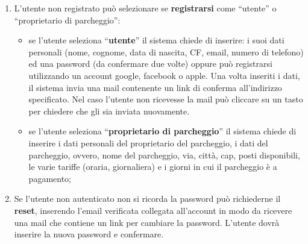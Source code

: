 \begin{enumerate}[start=1,label={\bfseries RF\arabic*}]
    \item \label{itm:RF1} L’utente non registrato può selezionare se \textbf{registrarsi} come “utente” o “proprietario di parcheggio”:
    \begin{itemize}
        \item se l’utente seleziona “\textbf{utente}” il sistema chiede di inserire: i suoi dati personali (nome, cognome, data di nascita, CF, email, numero di telefono) ed una password (da confermare due volte) oppure può registrarsi utilizzando un account google, facebook o apple.
        Una volta inseriti i dati, il sistema invia una mail contenente un link di conferma all’indirizzo specificato. Nel caso l’utente non ricevesse la mail può cliccare su un tasto per chiedere che gli sia inviata nuovamente.
        \item se l’utente seleziona “\textbf{proprietario di parcheggio}” il sistema chiede di inserire i dati personali del proprietario del parcheggio, i dati del parcheggio, ovvero, nome del parcheggio, via, città, cap, posti disponibili, le varie tariffe (oraria, giornaliera) e i giorni in cui il parcheggio è a pagamento;
    \end{itemize}
    \item \label{itm:RF2} Se l’utente non autenticato non si ricorda la password può richiederne il \textbf{reset}, inserendo l’email verificata collegata all’account in modo da ricevere una mail che contiene un link per cambiare la password. L’utente dovrà inserire la nuova password e confermare. 
\end{enumerate}

